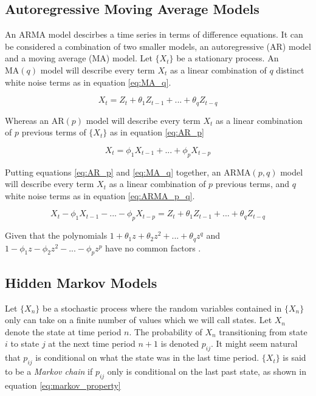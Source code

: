 \subsection{Autoregressive Moving Average Models}
An ARMA model descirbes a time series in terms of difference equations. It can be considered a combination of two smaller models, an autoregressive (AR) model and a moving average (MA) model. Let $\{X_t\}$ be a stationary process. An $\mathrm{MA}(q)$ model will describe every term $X_t$ as a linear combination of $q$ distinct white noise terms as in equation \eqref{eq:MA_q}.

\begin{equation}
    X_t = Z_{t} + \theta_1 Z_{t-1} + ... + \theta_q Z_{t-q}
    \label{eq:MA_q}
\end{equation}

Whereas an $\mathrm{AR}(p)$ model will describe every term $X_t$ as a linear combination of $p$ previous terms of $\{X_t\}$ as in equation \eqref{eq:AR_p}

\begin{equation}
    X_t = \phi_1 X_{t-1} + ... + \phi_p X_{t-p}
    \label{eq:AR_p}
\end{equation}

Putting equations \eqref{eq:AR_p} and \eqref{eq:MA_q} together, an $\mathrm{ARMA}(p,q)$ model will describe every term $X_t$ as a linear combination of $p$ previous terms, and $q$ white noise terms as in equation \eqref{eq:ARMA_p_q}.

\begin{equation}
    X_t - \phi_1 X_{t-1} - ... - \phi_p X_{t-p} = Z_{t} + \theta_1 Z_{t-1} + ... + \theta_q Z_{t-q}
    \label{eq:ARMA_p_q}
\end{equation}

Given that the polynomials $1 + \theta_1 z + \theta_2 z^2 + ... + \theta_q z^q$ and $1 - \phi_1 z - \phi_2 z^2 - ... - \phi_p z^p$ have no common factors \cite{brockwell_davis}.

\subsection{Hidden Markov Models} \label{s:hmm}
Let $\{X_n\}$ be a stochastic process where the random variables contained in $\{X_n\}$ only can take on a finite number of values which we will call states. Let $X_n$ denote the state at time period $n$. The probability of $X_n$ transitioning from state $i$ to state $j$ at the next time period $n+1$ is denoted $p_{ij}$. It might seem natural that $p_{ij}$ is conditional on what the state was in the last time period. $\{X_t\}$ is said to be a \textit{Markov chain} if $p_{ij}$ only is conditional on the last past state, as shown in equation \eqref{eq:markov_property}

